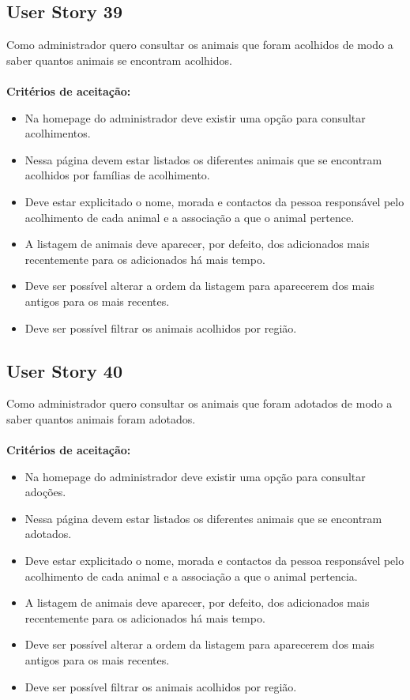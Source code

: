 \documentclass[a4paper,11pt]{article}
\begin{document}
\subsection*{User Story 39}
Como administrador quero consultar os animais que foram acolhidos de modo a saber quantos animais se encontram acolhidos.\\\\
\textbf{Critérios de aceitação:}
\begin{itemize}
    \item Na homepage do administrador deve existir uma opção para consultar acolhimentos.
    \item Nessa página devem estar listados os diferentes animais que se encontram acolhidos por famílias de acolhimento.
    \item Deve estar explicitado o nome, morada e contactos da pessoa responsável pelo acolhimento de cada animal e a associação a que o animal pertence.
    \item A listagem de animais deve aparecer, por defeito, dos adicionados mais recentemente para os adicionados há mais tempo.
    \item Deve ser possível alterar a ordem da listagem para aparecerem dos mais antigos para os mais recentes.
    \item Deve ser possível filtrar os animais acolhidos por região.
\end{itemize}

\subsection*{User Story 40}
Como administrador quero consultar os animais que foram adotados de modo a saber quantos animais foram adotados.\\\\
\textbf{Critérios de aceitação:}
\begin{itemize}
    \item Na homepage do administrador deve existir uma opção para consultar adoções.
    \item Nessa página devem estar listados os diferentes animais que se encontram adotados.
    \item Deve estar explicitado o nome, morada e contactos da pessoa responsável pelo acolhimento de cada animal e a associação a que o animal pertencia.
    \item A listagem de animais deve aparecer, por defeito, dos adicionados mais recentemente para os adicionados há mais tempo.
    \item Deve ser possível alterar a ordem da listagem para aparecerem dos mais antigos para os mais recentes.
    \item Deve ser possível filtrar os animais acolhidos por região.
\end{itemize}
\end{document}
